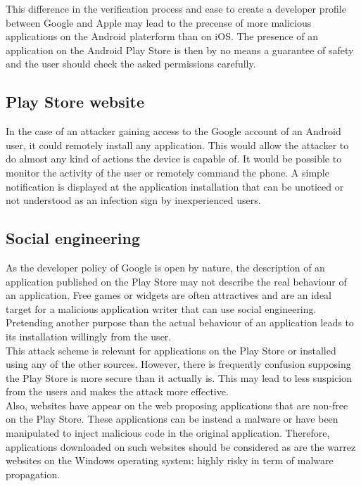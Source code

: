 This difference in the verification process and ease to create a developer profile between Google and Apple may lead to the precense of more malicious applications on the Android platerform than on iOS.
The presence of an application on the Android Play Store is then by no means a guarantee of safety and the user should check the asked permissions carefully.

\subsection{Play Store website}

In the case of an attacker gaining access to the Google account of an Android user, it could remotely install any application.
This would allow the attacker to do almost any kind of actions the device is capable of.
It would be possible to monitor the activity of the user or remotely command the phone.
A simple notification is displayed at the application installation that can be unoticed or not understood as an infection sign by inexperienced users.

\subsection{Social engineering}

As the developer policy of Google is open by nature, the description of an application published on the Play Store may not describe the real behaviour of an application.
Free games or widgets are often attractives and are an ideal target for a malicious application writer that can use social engineering.
Pretending another purpose than the actual behaviour of an application leads to its installation willingly from the user.\\

This attack scheme is relevant for applications on the Play Store or installed using any of the other sources.
However, there is frequently confusion supposing the Play Store is more secure than it actually is.
This may lead to less suspicion from the users and makes the attack more effective.\\

Also, websites have appear on the web proposing applications that are non-free on the Play Store.
These applications can be instead a malware or have been manipulated to inject malicious code in the original application.
Therefore, applications downloaded on such websites should be considered as are the warrez websites on the Windows operating system: highly risky in term of malware propagation.

